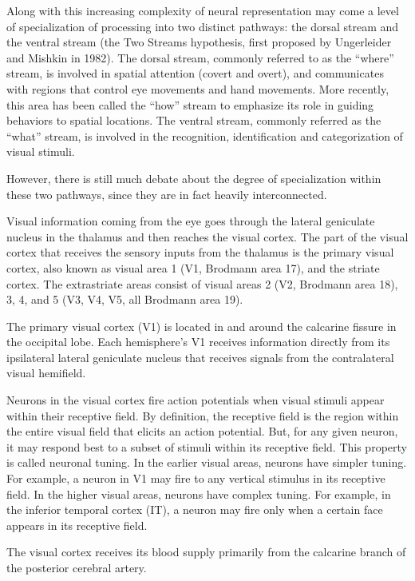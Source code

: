 \documentclass[]{book}
\begin{document}
Along with this increasing complexity of neural representation may come a level of specialization of processing into two distinct pathways: the dorsal stream and the ventral stream (the Two Streams hypothesis, first proposed by Ungerleider and Mishkin in 1982). The dorsal stream, commonly referred to as the ``where'' stream, is involved in spatial attention (covert and overt), and communicates with regions that control eye movements and hand movements. More recently, this area has been called the ``how'' stream to emphasize its role in guiding behaviors to spatial locations. The ventral stream, commonly referred as the ``what'' stream, is involved in the recognition, identification and categorization of visual stimuli.

However, there is still much debate about the degree of specialization within these two pathways, since they are in fact heavily interconnected.

Visual information coming from the eye goes through the lateral geniculate nucleus in the thalamus and then reaches the visual cortex. The part of the visual cortex that receives the sensory inputs from the thalamus is the primary visual cortex, also known as visual area 1 (V1, Brodmann area 17), and the striate cortex. The extrastriate areas consist of visual areas 2 (V2, Brodmann area 18), 3, 4, and 5 (V3, V4, V5, all Brodmann area 19).

The primary visual cortex (V1) is located in and around the calcarine fissure in the occipital lobe. Each hemisphere's V1 receives information directly from its ipsilateral lateral geniculate nucleus that receives signals from the contralateral visual hemifield.

Neurons in the visual cortex fire action potentials when visual stimuli appear within their receptive field. By definition, the receptive field is the region within the entire visual field that elicits an action potential. But, for any given neuron, it may respond best to a subset of stimuli within its receptive field. This property is called neuronal tuning. In the earlier visual areas, neurons have simpler tuning. For example, a neuron in V1 may fire to any vertical stimulus in its receptive field. In the higher visual areas, neurons have complex tuning. For example, in the inferior temporal cortex (IT), a neuron may fire only when a certain face appears in its receptive field.

The visual cortex receives its blood supply primarily from the calcarine branch of the posterior cerebral artery.
\end{document}
